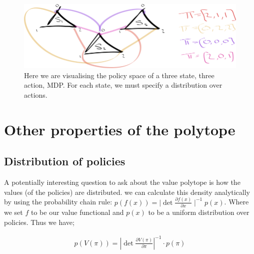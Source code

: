 \begin{figure}[h]
\centering
\includegraphics[width=1\textwidth,height=0.25\textheight]{../../pictures/drawings/3-state-3-action-simplices.png}
\caption{Here we are visualising the policy space of a three state, three action, MDP.
For each state, we must specify a distribution over actions.}
\end{figure}

\newpage

\section{Other properties of the polytope} \label{polytope-extras}



\subsection{Distribution of policies}

A potentially interesting question to ask about the value polytope is how the
values (of the policies) are distributed. we can calculate this
density analytically by using the probability chain rule:
\(p(f(x)) = \mid \det\frac{\partial f(x)}{\partial x}\mid^{-1}p(x)\).
Where we set \(f\) to be our value functional and \(p(x)\) to be a
uniform distribution over policies. Thus we have;

\begin{align}
p(V(\pi)) = |\det \frac{\partial V(\pi)}{\partial \pi}|^{-1} \cdot p(\pi) \tag{density}
\end{align}

